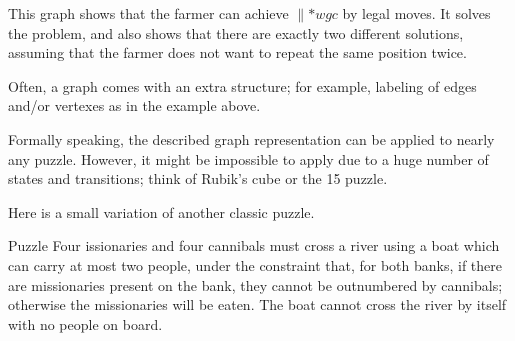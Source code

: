 \begin{center}
\end{center}

This graph shows that the farmer can achieve ${}{\parallel}{{*}wgc}$ by legal moves.
It solves the problem, and also shows that there are exactly two different solutions,
assuming that the farmer does not want to repeat the same position twice. 
\qeds

Often, a graph comes with an extra structure; for example, labeling of edges and/or vertexes as in the example above.

Formally speaking, the described graph representation can be applied to nearly any puzzle.
However, it might be impossible to apply due to a huge number of states and transitions;
think of Rubik's cube or the 15 puzzle.

Here is a small variation of another classic puzzle.

\begin{thm}{Puzzle} Four issionaries and four cannibals must cross a river using a boat which can carry at most two people, under the constraint that, for both banks, if there are missionaries present on the bank, they cannot be outnumbered by cannibals; otherwise the missionaries will be eaten.
The boat cannot cross the river by itself with no people on board.
\end{thm}

